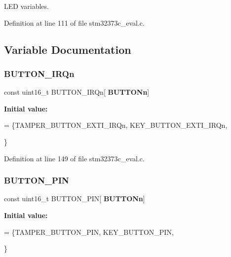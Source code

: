 L\+ED variables. 



Definition at line 111 of file stm32373c\+\_\+eval.\+c.



\subsection{Variable Documentation}
\mbox{\label{group___private___variables_ga677eb99a3bb43101358dfce35efefae2}} 
\subsubsection{B\+U\+T\+T\+O\+N\+\_\+\+I\+R\+Qn}
{\footnotesize\ttfamily const uint16\+\_\+t B\+U\+T\+T\+O\+N\+\_\+\+I\+R\+Qn[\textbf{ B\+U\+T\+T\+O\+Nn}]}

{\bfseries Initial value\+:}
\begin{DoxyCode}
= \{TAMPER_BUTTON_EXTI_IRQn,
                                       KEY_BUTTON_EXTI_IRQn,





                                     \}
\end{DoxyCode}


Definition at line 149 of file stm32373c\+\_\+eval.\+c.

\mbox{\label{group___private___variables_gadf78f2d71408a01f8d30929c2d2da82b}} 
\subsubsection{B\+U\+T\+T\+O\+N\+\_\+\+P\+IN}
{\footnotesize\ttfamily const uint16\+\_\+t B\+U\+T\+T\+O\+N\+\_\+\+P\+IN[\textbf{ B\+U\+T\+T\+O\+Nn}]}

{\bfseries Initial value\+:}
\begin{DoxyCode}
= \{TAMPER_BUTTON_PIN,
                                      KEY_BUTTON_PIN,





                                \}
\end{DoxyCode}


